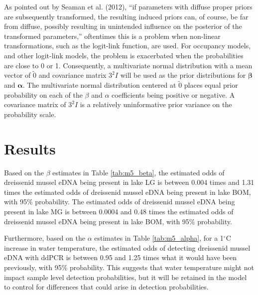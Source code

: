 \documentclass[12pt]{article}\usepackage[]{graphicx}\usepackage[]{color}
\begin{document}
\noindent As pointed out by Seaman et al. (2012), ``if parameters with diffuse proper priors are subsequently transformed, the resulting induced priors can, of course, be far from diffuse, possibly resulting in unintended influence on the posterior of the transformed parameters,'' oftentimes this is a problem when non-linear transformations, such as the logit-link function, are used. For occupancy models, and other logit-link models, the problem is exacerbated when the probabilities are close to 0 or 1. Consequently, a multivariate normal distribution with a mean vector of $\tilde 0$ and covariance matrix $3^2I$ will be used as the prior distributions for $\bm\beta$ and $\bm\alpha$. The multivariate normal distribution centered at $\tilde 0$ places equal prior probability on each of the $\beta$ and $\alpha$ coefficients being positive or negative. A covariance matrix of $3^2I$ is a relatively uninformative prior variance on the probability scale. 






































\section{Results}

Based on the $\beta$ estimates in Table \ref{tab:m5_beta}, the estimated odds of dreissenid mussel eDNA being present in lake LG is between 0.004 times and 1.31 times the estimated odds of dreissenid mussel eDNA being present in lake BOM, with 95\% probability. The estimated odds of dreissenid mussel eDNA being present in lake MG is between 0.0004 and 0.48 times the estimated odds of dreissenid mussel eDNA being present in lake BOM, with 95\% probability. 

Furthermore, based on the $\alpha$ estimates in Table \ref{tab:m5_alpha}, for a 1$^\circ$C increase in water temperature, the estimated odds of detecting dreissenid mussel eDNA with ddPCR is between 0.95 and 1.25 times what it would have been previously, with 95\% probability. This suggests that water temperature might not impact sample level detection probabilities, but it will be retained in the model to control for differences that could arise in detection probabilities.
\end{document}
